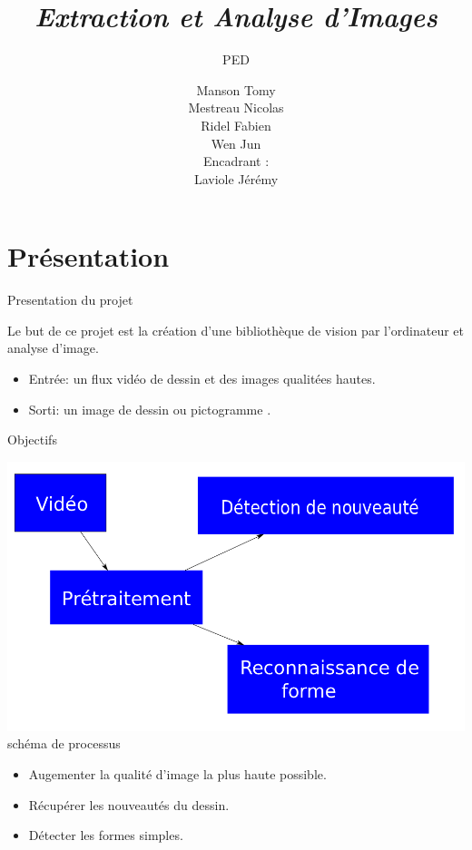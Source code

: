 \documentclass[t,14pt]{beamer}
\title{\textbf{\textit{Extraction et Analyse d'Images}}}
\subtitle{PED}
\author{\scriptsize{Manson Tomy\\
		Mestreau Nicolas\\
		Ridel Fabien\\
		Wen Jun\\
		\vspace{10mm}
		Encadrant : \\
		Laviole Jérémy\\
		}}
\institute{\tiny Université de Bordeaux 1}
\begin{document}
\frame{\titlepage}

\section[Présentation]{Présentation}

\begin{frame}{Presentation du projet}
\begin{center}
\vspace{5mm}
Le but de ce projet est la création d'une bibliothèque de vision par l'ordinateur et analyse d'image.

\end{center}
\begin{itemize}
\item Entrée: un flux vidéo de dessin et des images qualitées hautes.
\item Sorti: un image de dessin ou pictogramme .
\end{itemize}
\end{frame}

\begin{frame}{Objectifs}
\begin{center}
\includegraphics[scale=0.2]{images/dessin.png} 
\\ schéma de processus
\end{center}
\begin{itemize}
\item Augementer la qualité d'image la plus haute possible.
\item Récupérer les nouveautés du dessin.
\item Détecter les formes simples. 
\end{itemize}
\end{frame}
\end{document}
